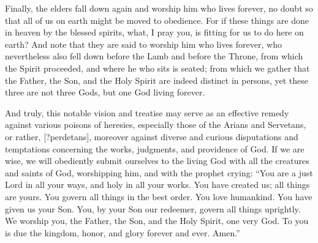 Finally, the elders fall down again and worship him who lives forever, no doubt so that all of us on earth might be moved to obedience. For if these things are done in heaven by the blessed spirits, what, I pray you, is fitting for us to do here on earth? And note that they are said to worship him who lives forever, who nevertheless also fell down before the Lamb and before the Throne, from which the Spirit proceeded, and where he who sits is seated; from which we gather that the Father, the Son, and the Holy Spirit are indeed distinct in persons, yet these three are not three Gods, but one God living forever.

And truly, this notable vision and treatise may serve as an effective remedy against various poisons of heresies, especially those of the Arians and Servetans, or rather, [?perdetans], moreover against diverse and curious disputations and temptations concerning the works, judgments, and providence of God. If we are wise, we will obediently submit ourselves to the living God with all the creatures and saints of God, worshipping him, and with the prophet crying: “You are a just Lord in all your ways, and holy in all your works. You have created us; all things are yours. You govern all things in the best order. You love humankind. You have given us your Son. You, by your Son our redeemer, govern all things uprightly. We worship you, the Father, the Son, and the Holy Spirit, one very God. To you is due the kingdom, honor, and glory forever and ever. Amen.”
